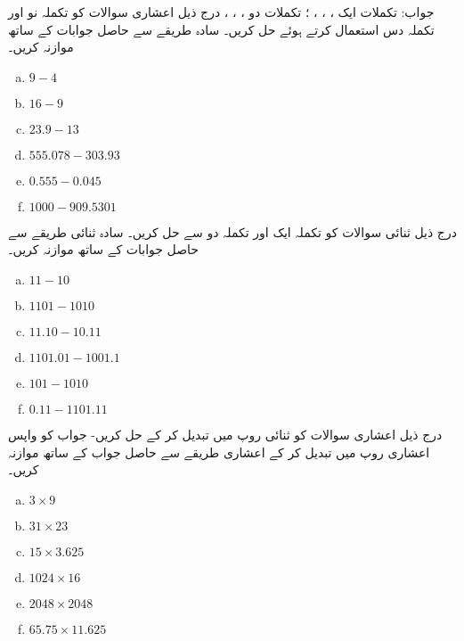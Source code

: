 جواب: تکملات ایک  ، ، ، ؛  تکملات دو  ، ، ، 
درج ذیل اعشاری سوالات کو تکملہ نو اور تکملہ دس استعمال کرتے ہوئے حل کریں۔ سادہ طریقے سے حاصل جوابات کے ساتھ موازنہ کریں۔
\begin{multicols}{3}
\begin{enumerate}[a.]

\item  
 \(9-4\)  
\item   
 \(16-9\) 
\item  
 \(23.9-13\) 
\item  
 \(555.078-303.93\) 
\item  
 \(0.555-0.045\) 
\item  
 \(1000-909.5301\) 
\end{enumerate}
\end{multicols}
درج ذیل ثنائی سوالات کو تکملہ ایک اور تکملہ دو سے حل کریں۔ سادہ ثنائی طریقے سے حاصل جوابات کے ساتھ موازنہ کریں۔
\begin{multicols}{3}
\begin{enumerate}[a.]
\item  
 \(11-10\)  
\item  
 \(1101-1010\) 
\item  
 \(11.10-10.11\) 
\item  
 \(1101.01-1001.1\) 
\item  
 \(101-1010\) 
\item  
 \(0.11-1101.11\) 
\end{enumerate}
\end{multicols}
درج ذیل اعشاری سوالات کو ثنائی روپ میں تبدیل کر کے حل کریں- جواب کو واپس اعشاری روپ میں تبدیل کر کے اعشاری طریقے سے حاصل جواب کے ساتھ موازنہ کریں۔
\begin{multicols}{4}
\begin{enumerate}[a.]
\item 
 \(3\times 9\)   
\item 
 \(31\times 23\)   
\item 
 \(15\times 3.625\)  
\item  
 \(1024\times 16\) 
\item 
 \(2048\times 2048\) 
\item 
 \(65.75\times 11.625\) 
\end{enumerate}
\end{multicols}

